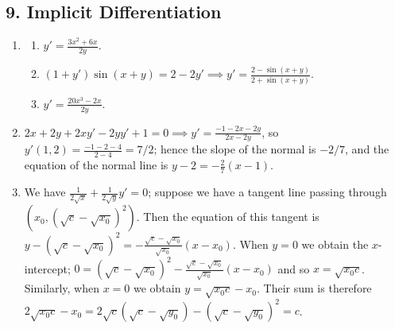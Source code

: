 \subsection*{9. Implicit Differentiation}
\begin{enumerate}
  \item
    \begin{enumerate}
      \item $ y' = \frac{3x^2 + 6x}{2y} $.
      \item $ (1 + y')\sin(x + y) = 2 - 2y' \implies y' = \frac{2 - \sin(x + y)}{2 + \sin(x + y)} $.
      \item $ y' = \frac{20x^3 - 2x}{2y} $.
    \end{enumerate}
  \item $ 2x + 2y + 2xy' - 2yy' + 1 = 0 \implies y' = \frac{-1 - 2x - 2y}{2x - 2y} $, so $ y'(1,2) = \frac{-1 - 2 - 4}{2 - 4} = 7/2 $; hence the
        slope of the normal is $ -2/7 $, and the equation of the normal line is $ y - 2 = -\frac{2}{7}(x - 1) $.
  \item We have $ \frac{1}{2\sqrt{x}} + \frac{1}{2\sqrt{y}} y' = 0 $; suppose we have a tangent line passing through $ (x_0, (\sqrt{c} - \sqrt{x_0})^2) $.
        Then the equation of this tangent is $ y - (\sqrt{c} - \sqrt{x_0})^2 = -\frac{\sqrt{c} - \sqrt{x_0}}{\sqrt{x_0}} (x - x_0) $.
        When $ y = 0 $ we obtain the $ x$-intercept; $ 0 = (\sqrt{c} - \sqrt{x_0})^2 -\frac{\sqrt{c} - \sqrt{x_0}}{\sqrt{x_0}} (x - x_0) $ and so $ x = \sqrt{x_0 c} $.
        Similarly, when $ x = 0 $ we obtain $ y = \sqrt{x_0 c} -  x_0 $. Their sum is therefore $ 2\sqrt{x_0 c} - x_0 = 2\sqrt{c}(\sqrt{c} - \sqrt{y_0}) - (\sqrt{c} - \sqrt{y_0})^2 = c $.
\end{enumerate}


